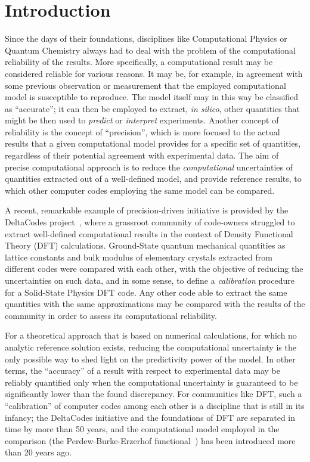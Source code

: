 \documentclass[reprint,aps,prb]{revtex4-1}
\begin{document}
\section{Introduction}
Since the days of their foundations, disciplines like Computational Physics or Quantum Chemistry always had to deal with the problem of the 
computational reliability of the results. More specifically, a computational result may be considered reliable for various reasons.
It may be, for example, in agreement with some previous observation or measurement that the employed computational model is susceptible to reproduce.
The model itself may in this way be classified as ``accurate''; it can then be employed to extract, \textit{in silico},
other quantities that might be then used to \emph{predict} or \emph{interpret} experiments.
Another concept of reliability is the concept of  ``precision'', which is more focused to the actual results
that a given computational model provides for a specific set of quantities, regardless of their potential agreement with 
experimental data. The aim of precise computational approach is to reduce the \emph{computational} uncertainties
of quantities extracted out of a well-defined model, and provide reference results, to which other computer codes
employing the same model can be compared.

A recent, remarkable example of precision-driven initiative is provided by the DeltaCodes project~\cite{deltaTest2016},
where a grassroot community of code-owners struggled to extract well-defined computational results in the context of 
Density Functional Theory (DFT) calculations. Ground-State quantum mechanical quantities as lattice constants and bulk modulus of 
elementary crystals extracted from different codes were compared with each other, with the objective of reducing the uncertainties 
on such data, and in some sense, to define a \emph{calibration} procedure for a Solid-State Physics DFT code. 
Any other code able to extract the same quantities with the same approximations may be compared with the 
results of the community in order to assess its computational reliability.

For a theoretical approach that is based on numerical calculations, for which no analytic reference solution exists, 
reducing the computational uncertainty is the only possible way to shed light on the predictivity power of the
model. In other terms, the ``accuracy'' of a result with respect to experimental data may be reliably quantified
only when the computational uncertainty is guaranteed to be significantly lower than the found discrepancy.
For communities like DFT, such a ``calibration'' of computer codes among each other is a discipline that is still in its infancy;
the DeltaCodes initiative and the foundations of DFT are separated in time by more than 50 years, and the computational
model employed in the comparison (the Perdew-Burke-Erzerhof functional~\cite{PBE}) has been introduced more than 20 years ago.
\end{document}
